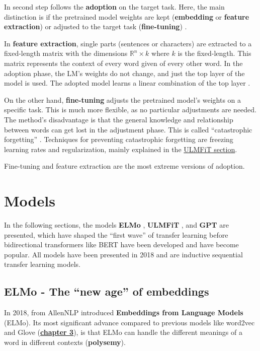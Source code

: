 \documentclass[]{krantz}
\begin{document}
In second step follows the \textbf{adoption} on the target task. Here, the main distinction is if the pretrained model weights are kept (\textbf{embedding} or \textbf{feature extraction}) or adjusted to the target task (\textbf{fine-tuning}) \citep{peterrudersmith2019}.

In \textbf{feature extraction}, single parts (sentences or characters) are extracted to a fixed-length matrix with the dimensions \(\mathbb{R}^{n} \times k\) where \(k\) is the fixed-length. This matrix represents the context of every word given of every other word. In the adoption phase, the LM's weights do not change, and just the top layer of the model is used. The adopted model learns a linear combination of the top layer \citep{peterrudersmith2019}.

On the other hand, \textbf{fine-tuning} adjusts the pretrained model's weights on a specific task. This is much more flexible, as no particular adjustments are needed. The method's disadvantage is that the general knowledge and relationship between words can get lost in the adjustment phase. This is called ``catastrophic forgetting'' \citep{mccloskey1989, french1999}. Techniques for preventing catastrophic forgetting are freezing learning rates and regularization, mainly explained in the \protect\hyperlink{ulmfit}{ULMFiT section}.

Fine-tuning and feature extraction are the most extreme versions of adoption.

\hypertarget{models}{%
\section{Models}\label{models}}

In the following sections, the models \textbf{ELMo} \citep{peter2018}, \textbf{ULMFiT} \citep{howardruder2018}, and \textbf{GPT} \citep{radford2018} are presented, which have shaped the ``first wave'' of transfer learning before bidirectional transformers like BERT have been developed and have become popular. All models have been presented in 2018 and are inductive sequential transfer learning models.

\hypertarget{elmo---the-new-age-of-embeddings}{%
\subsection{ELMo - The ``new age'' of embeddings}\label{elmo---the-new-age-of-embeddings}}

In 2018, \citet{peter2018} from AllenNLP introduced \textbf{Embeddings from Language Models} (ELMo). Its most significant advance compared to previous models like word2vec and Glove (\protect\hyperlink{foundationsapplications-of-modern-nlp}{\textbf{chapter 3}}), is that ELMo can handle the different meanings of a word in different contexts (\textbf{polysemy}).
\end{document}
